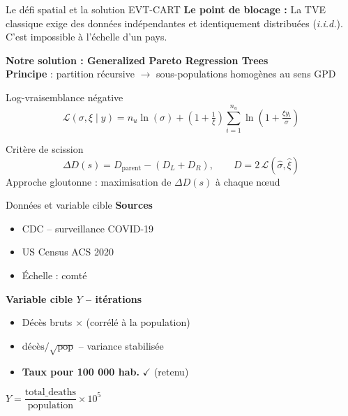 \documentclass[10pt, aspectratio=1610]{beamer}
\begin{document}
\begin{frame}{Le défi spatial et la solution EVT-CART}
    \textbf{Le point de blocage :} La TVE classique exige des données indépendantes et identiquement distribuées (\textit{i.i.d.}). C'est impossible à l'échelle d'un pays.
    \vspace{0.3cm}

    \textbf{Notre solution : Generalized Pareto Regression Trees}\\
    \textbf{Principe} : partition récursive $\rightarrow$ sous-populations homogènes au sens GPD

    \vspace{0.4cm}

    \begin{block}{Log-vraisemblance négative}
        \[
        \mathcal{L}(\sigma, \xi \mid y) = n_u \ln(\sigma) + \left( 1 + \tfrac{1}{\xi} \right) \sum_{i=1}^{n_u} \ln\!\left( 1 + \tfrac{\xi y_i}{\sigma} \right)
        \]
    \end{block}

    \begin{block}{Critère de scission}
        \[
        \Delta D(s) = D_{\text{parent}} - (D_L + D_R), \qquad D = 2\,\mathcal{L}(\hat\sigma, \hat\xi)
        \]
        Approche gloutonne : maximisation de $\Delta D(s)$ à chaque nœud
    \end{block}
\end{frame}

\begin{frame}{Données et variable cible}
    \textbf{Sources}
    \begin{itemize}
        \item CDC -- surveillance COVID-19
        \item US Census ACS 2020
        \item Échelle : comté
    \end{itemize}

    \vspace{0.4cm}

    \textbf{Variable cible $Y$ -- itérations}
    \begin{itemize}
        \item Décès bruts \textcolor{pontsred}{$\times$} (corrélé à la population)
        \item $\text{décès}/\sqrt{\text{pop}}$ -- variance stabilisée
        \item \textbf{Taux pour 100 000 hab.} \textcolor{pontsblue}{$\checkmark$} (retenu)
    \end{itemize}

    \vspace{0.4cm}

    \begin{exampleblock}{}
        \centering
        $Y = \dfrac{\text{total\_deaths}}{\text{population}} \times 10^5$
    \end{exampleblock}
\end{frame}
\end{document}

